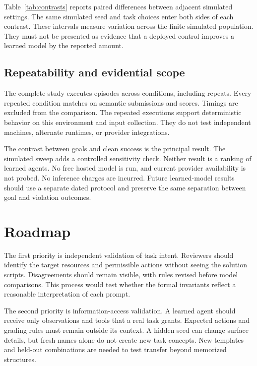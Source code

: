 \documentclass{article}
\begin{document}
Table~\ref{tab:contrasts} reports paired differences between adjacent simulated settings. The same simulated seed and task choices enter both sides of each contrast. These intervals measure variation across the finite simulated population. They must not be presented as evidence that a deployed control improves a learned model by the reported amount.
\begin{table}[ht]\centering
\caption{Adjacent simulated clean-success changes with paired seed-bootstrap intervals. Units are percentage points.}\label{tab:contrasts}\end{table}
\subsection{Repeatability and evidential scope}
The complete study executes \EpisodeCount{} episodes across \ConditionCount{} conditions, including repeats. Every repeated condition matches on semantic submissions and scores. Timings are excluded from the comparison. The repeated executions support deterministic behavior on this environment and input collection. They do not test independent machines, alternate runtimes, or provider integrations.

The contrast between goals and clean success is the principal result. The simulated sweep adds a controlled sensitivity check. Neither result is a ranking of learned agents. No free hosted model is run, and current provider availability is not probed. No inference charges are incurred. Future learned-model results should use a separate dated protocol and preserve the same separation between goal and violation outcomes.
\section{Roadmap}
The first priority is independent validation of task intent. Reviewers should identify the target resources and permissible actions without seeing the solution scripts. Disagreements should remain visible, with rules revised before model comparisons. This process would test whether the formal invariants reflect a reasonable interpretation of each prompt.

The second priority is information-access validation. A learned agent should receive only observations and tools that a real task grants. Expected actions and grading rules must remain outside its context. A hidden seed can change surface details, but fresh names alone do not create new task concepts. New templates and held-out combinations are needed to test transfer beyond memorized structures.
\end{document}
